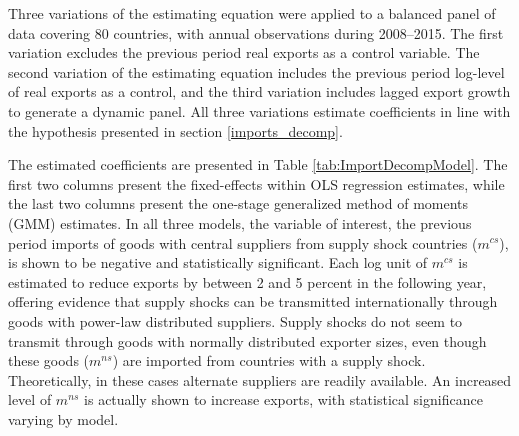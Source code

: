 \documentclass[10pt,letterpaper]{article}
\begin{document}
Three variations of the estimating equation were applied to a balanced panel of data covering 80 countries, with annual observations during 2008--2015. The first variation excludes the previous period real exports as a control variable. The second variation of the estimating equation includes the previous period log-level of real exports as a control, and the third variation includes lagged export growth to generate a dynamic panel. All three variations estimate coefficients in line with the hypothesis presented in section \ref{imports_decomp}. 

The estimated coefficients are presented in Table \ref{tab:ImportDecompModel}. The first two columns present the fixed-effects within OLS regression estimates, while the last two columns present the one-stage generalized method of moments (GMM) estimates. In all three models, the variable of interest, the previous period imports of goods with central suppliers from supply shock countries ($m^{cs}$), is shown to be negative and statistically significant. Each log unit of $m^{cs}$ is estimated to reduce exports by between 2 and 5 percent in the following year, offering evidence that supply shocks can be transmitted internationally through goods with power-law distributed suppliers. Supply shocks do not seem to transmit through goods with normally distributed exporter sizes, even though these goods ($m^{ns}$) are imported from countries with a supply shock. Theoretically, in these cases alternate suppliers are readily available. An increased level of $m^{ns}$ is actually shown to increase exports, with statistical significance varying by model. 
\end{document}
